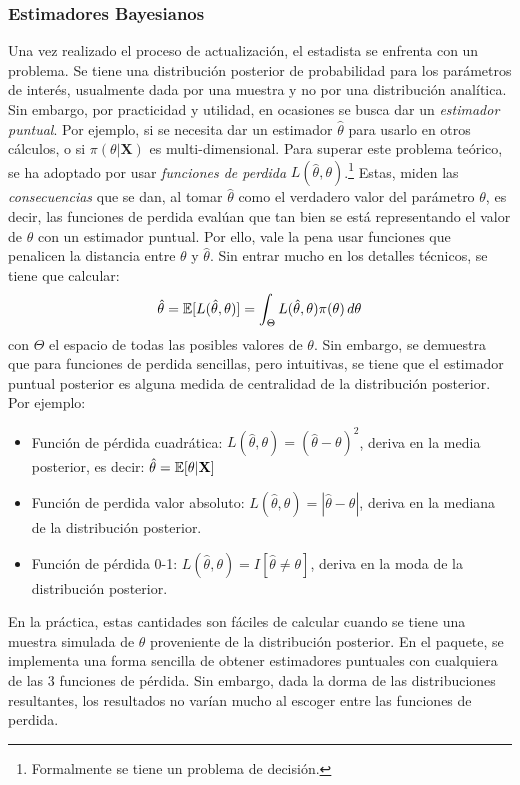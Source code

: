 \documentclass[../Main/Main.tex]{subfiles}
\begin{document}
\subsubsection{Estimadores Bayesianos}
Una vez realizado el proceso de actualización, el estadista se enfrenta con un problema. Se tiene una distribución posterior de probabilidad para los parámetros de interés, usualmente dada por una muestra y no por una distribución analítica. Sin embargo, por practicidad y utilidad, en ocasiones se busca dar un \textit{estimador puntual}. Por ejemplo, si se necesita dar un estimador $\hat \theta$ para usarlo en otros cálculos, o si $\pi(\theta|\mathbf{X})$ es multi-dimensional. Para superar este problema teórico, se ha adoptado por usar \textit{funciones de perdida} $L(\hat{\theta},\theta)$.\footnote{Formalmente se tiene un problema de decisión.} Estas, miden las \textit{consecuencias} que se dan, al tomar $\hat{\theta}$ como el verdadero valor del parámetro $\theta$, es decir, las funciones de perdida evalúan que tan bien se está representando el valor de $\theta$ con un estimador puntual. Por ello, vale la pena usar funciones que penalicen la distancia entre $\theta$ y $\hat{\theta}$. Sin entrar mucho en los detalles técnicos, se tiene que calcular: 
\begin{align}
\hat{\theta} = \mathbb{E}[L(\hat{\theta},\theta)] = \int_\Theta L(\hat{\theta},\theta) \pi(\theta)\, d\theta
\end{align}
con $\Theta$ el espacio de todas las posibles valores de $\theta$. Sin embargo, se demuestra que para funciones de perdida sencillas, pero intuitivas, se tiene que el estimador puntual posterior es alguna medida de centralidad de la distribución posterior. Por ejemplo:
\begin{itemize}[label={}]
	\item Función de pérdida cuadrática: $L(\hat{\theta},\theta) = (\hat{\theta}-\theta)^2$, deriva en la media posterior, es decir: $\hat{\theta} = \mathbb{E}[\theta|\mathbf{X}]$ 
	\item Función de perdida valor absoluto: $L(\hat{\theta},\theta) = |\hat{\theta}-\theta|$, deriva en la mediana de la distribución posterior.
	\item Función de pérdida 0-1:  $L(\hat{\theta},\theta) = I[\hat{\theta} \neq \theta]$, deriva en la moda de la distribución posterior. 
\end{itemize}

En la práctica, estas cantidades son fáciles de calcular cuando se tiene una muestra simulada de $\theta$ proveniente de la distribución posterior. En el paquete, se implementa una forma sencilla de obtener estimadores puntuales con cualquiera de las 3 funciones de pérdida. Sin embargo, dada la dorma de las distribuciones resultantes, los resultados no varían mucho al escoger entre las funciones de perdida.
\end{document}
